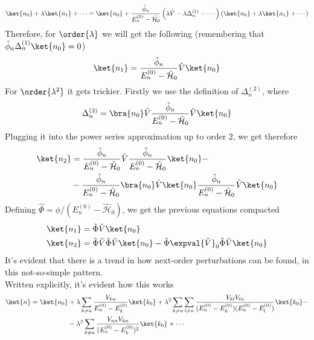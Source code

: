 \documentclass[a4paper, 11pt]{book}
\newcommand{\1}{\opr{\mathds{1}}}
\newcommand{\ham}{\mathcal{H}}
\newcommand{\opr}[1]{\hat{#1}}
\theoremstyle{plain}
\begin{document}
	\begin{equation*}
		\ket{n_0}+\lambda\ket{n_1}+\cdots=\ket{n_0}+\frac{\opr{\phi}_n}{E_n^{(0)}-\opr{\ham}_0}\left( \lambda\opr{V}-\lambda\Delta_n^{(1)}-\cdots \right)\left( \ket{n_0}+\lambda\ket{n_1}+\cdots \right)
	\end{equation*}
	Therefore, for $\order{\lambda}$ we will get the following (remembering that $\opr{\phi}_n\Delta^{(1)}_n\ket{n_0}=0$)
	\begin{equation}
		\ket{n_1}=\frac{\opr{\phi}_n}{E_n^{(0)}-\opr{\ham}_0}\opr{V}\ket{n_0}
		\label{eq:order1ptt}
	\end{equation}
	For $\order{\lambda^2}$ it gets trickier. Firstly we use the definition of $\Delta_n^{(2)}$, where
	\begin{equation*}
		\Delta_n^{(2)}=\bra{n_0}\opr{V}\frac{\opr{\phi}_n}{E_n^{(0)}-\opr{\ham}_0}\opr{V}\ket{n_0}
	\end{equation*}
	Plugging it into the power series approximation up to order $2$, we get therefore
	\begin{equation}
		\begin{aligned}
			\ket{n_2}&=\frac{\opr{\phi}_n}{E_n^{(0)}-\opr{\ham}_0}\opr{V}\frac{\opr{\phi}_n}{E_n^{(0)}-\opr{\ham}_0}\ket{n_0}-\\
			&-\frac{\opr{\phi}_n}{E_n^{(0)}-\opr{\ham}_0}\bra{n_0}\opr{V}\ket{n_0}\frac{\opr{\phi}_n}{E_n^{(0)}-\opr{\ham}_0}\opr{V}\ket{n_0}
		\end{aligned}
		\label{eq:order2ptt}
	\end{equation}
	Defining $\opr{\Phi}=\opr{\phi}/(E_n^{(0)}-\opr{\ham}_0)$, we get the previous equations compacted
	\begin{equation}
		\begin{aligned}
			\ket{n_1}&=\opr{\Phi}\opr{V}\ket{n_0}\\
			\ket{n_2}&=\opr{\Phi}\opr{V}\opr{\Phi}\opr{V}\ket{n_0}-\opr{\Phi}\expval{\opr{V}}_0\opr{\Phi}\opr{V}\ket{n_0}
		\end{aligned}
		\label{eq:compact}
	\end{equation}
	It's evident that there is a trend in how next-order perturbations can be found, in this not-so-simple pattern.\\
	Written explicitly, it's evident how this works
	\begin{equation*}
		\begin{aligned}
			\ket{n}=\ket{n_0}&+\lambda\sum_{k\ne n}\frac{V_{kn}}{E_n^{(0)}-E_k^{(0)}}\ket{k_0}+\lambda^2\sum_{k\ne n}\sum_{l\ne n}\frac{V_{kl}V_{ln}}{(E_n^{(0)}-E_k^{(0)})(E_n^{(0)}-E_l^{(0)})}\ket{k_0}-\\
			&-\lambda^2\sum_{k\ne n}\frac{V_{nn}V_{kn}}{(E_n^{(0)}-E_k^{(0)})^2}\ket{k_0}+\cdots
		\end{aligned}
	\end{equation*}
\end{document}
